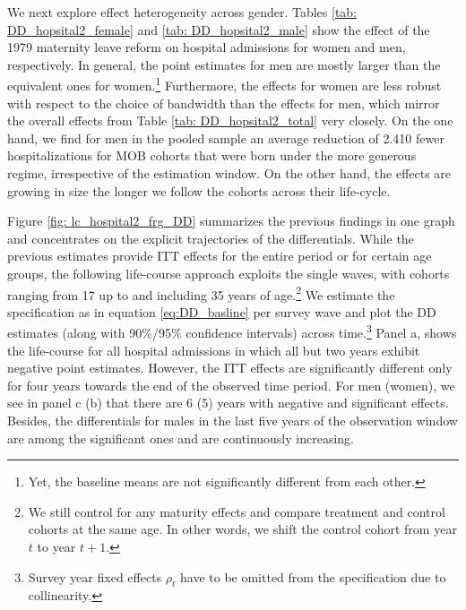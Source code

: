 \documentclass[11pt, a4paper]{article} %
\begin{document}
We next explore effect heterogeneity across gender. Tables \ref{tab: DD_hopsital2_female} and \ref{tab: DD_hopsital2_male} show the effect of the 1979 maternity leave reform on hospital admissions for women and men, respectively. In general, the point estimates for men are mostly larger than the equivalent ones for women.\footnote{Yet, the baseline means are not significantly different from each other.} Furthermore, the effects for women are less robust with respect to the choice of bandwidth than the effects for men, which mirror the overall effects from Table \ref{tab: DD_hopsital2_total} very closely. On the one hand, we find for men in the pooled sample an average reduction of 2.410 fewer hospitalizations for MOB cohorts that were born under the more generous regime, irrespective of the estimation window. On the other hand, the effects are growing in size the longer we follow the cohorts across their life-cycle. \newline

Figure \ref{fig: lc_hospital2_frg_DD} summarizes the previous findings in one graph and concentrates on the explicit trajectories of the differentials. While the previous estimates provide ITT effects for the entire period or for certain age groups, the following life-course approach exploits the single waves, with cohorts ranging from 17 up to and including 35 years of age.\footnote{We still control for any maturity effects and compare treatment and control cohorts at the same age. In other words, we shift the control cohort from year $t$ to year $t+1$.} We estimate the specification as in equation \ref{eq:DD_basline} per survey wave and plot the DD estimates (along with 90\%/95\% confidence intervals) across time.\footnote{Survey year fixed effects $\rho_t$ have to be omitted from the specification due to collinearity.} Panel a, shows the life-course for all hospital admissions in which all but two years exhibit negative point estimates. However, the ITT effects are significantly different only for four years towards the end of the observed time period. For men (women), we see in panel c (b) that there are 6 (5) years with negative and significant effects. Besides, the differentials for males in the last five years of the observation window are among the significant ones and are continuously increasing.\newline
\end{document}
